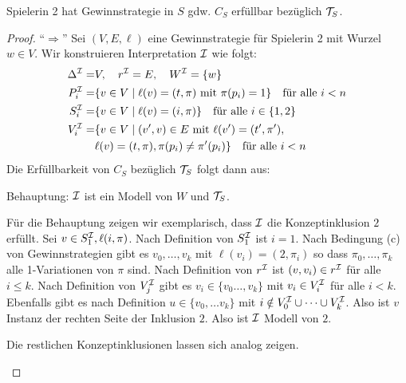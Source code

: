 \begin{lemma}
    Spielerin 2 hat Gewinnstrategie in $S$ gdw. $C_S$ erfüllbar bezüglich $\mathcal{T}_S$.
\end{lemma}

\begin{proof}
    \enquote{$\Rightarrow$} Sei $(V, E, \ell)$ eine Gewinnstrategie für Spielerin 2 mit Wurzel $w \in V$. Wir konstruieren Interpretation $\mathcal{I}$ wie folgt:
    \begin{align*}
        \Delta^{\mathcal{I}} = &V, \quad r^{\mathcal{I}} = E, \quad W^{\mathcal{I}} = \{w\}\\
        P_i^{\mathcal{I}} = &\{ v \in V \mid \ell(v) = (t, \pi) \text{ mit } \pi(p_i) = 1\} \quad \text{für alle } i < n\\
        S_i^{\mathcal{I}} = &\{v \in V \mid \ell(v) = (i, \pi)\} \quad \text{für alle } i \in \{1, 2\}\\
        V_i^{\mathcal{I}} = &\{ v \in V \mid (v', v) \in E \text{ mit } \ell(v') = (t', \pi'),\\
                  &\ell(v) = (t, \pi), \pi(p_i) \neq \pi'(p_i) \} \quad \text{für alle } i < n
    \end{align*}
    Die Erfüllbarkeit von $C_S$ bezüglich $\mathcal{T}_S$ folgt dann aus:

    Behauptung: $\mathcal{I}$ ist ein Modell von $W$ und $\mathcal{T}_S$.
    \begin{tafel}
        Für die Behauptung zeigen wir exemplarisch, dass $\mathcal{I}$ die Konzeptinklusion $2$ erfüllt.  Sei $v \in S_1^{\mathcal{I}}, \ell(i, \pi)$. Nach Definition von $S_1^{\mathcal{I}}$ ist $i = 1$. Nach Bedingung (c) von Gewinnstrategien gibt es $v_0,\ldots,v_k$ mit $\ell(v_i) = (2, \pi_i)$ so dass $\pi_0, \ldots, \pi_k$ alle 1-Variationen von $\pi$ sind. Nach Definition von $r^{\mathcal{I}}$ ist $(v, v_i)\in r^{\mathcal{I}}$ für alle $i \leq k$. Nach Definition von $V_j^{\mathcal{I}}$ gibt es $v_i \in \{v_0\ldots, v_k\}$ mit $v_i \in V_i^{\mathcal{I}}$ für alle $i < k$. Ebenfalls gibt es nach Definition $u \in \{v_0, \ldots v_k\}$ mit $i \notin V_0^{\mathcal{I}} \cup \dots \cup V_k^{\mathcal{I}}$. Also ist $v$ Instanz der rechten Seite der Inklusion $2$. Also ist $\mathcal{I}$ Modell von $2$.

        Die restlichen Konzeptinklusionen lassen sich analog zeigen.
    \end{tafel}
\end{proof}

